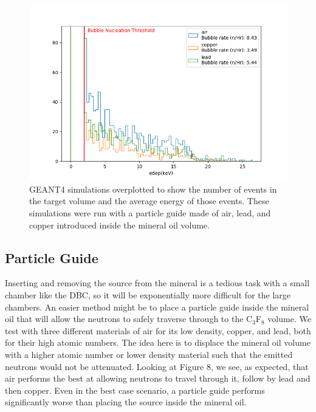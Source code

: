 \documentclass[%
12pt,
twoside,
reprint,
amsmath,amssymb,
aps,
]{article}
\begin{document}
	\begin{figure}[!b]
		\includegraphics[scale = 0.6, center]{Images/particle_guide.png}
		\caption{\label{tab:table-name} GEANT4 simulations overplotted to show the number of events in the target volume and the average energy of those events. These simulations were run with a particle guide made of air, lead, and copper introduced inside the mineral oil volume.}
	\end{figure}
	
	\subsection{Particle Guide}
	\par Inserting and removing the source from the mineral is a tedious task with a small chamber like the DBC, so it will be exponentially more difficult for the large chambers. An easier method might be to place a particle guide inside the mineral oil that will allow the neutrons to safely traverse through to the C$_{3}$F$_{8}$ volume. We test with three different materials of air for its low density, copper, and lead, both for their high atomic numbers. The idea here is to displace the mineral oil volume with a higher atomic number or lower density material such that the emitted neutrons would not be attenuated. Looking at Figure 8, we see, as expected, that air performs the best at allowing neutrons to travel through it, follow by lead and then copper. Even in the best case scenario, a particle guide performs significantly worse than placing the source inside the mineral oil.
\end{document}

